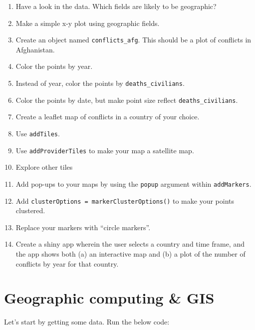 \documentclass[
]{book}
\begin{document}
\begin{enumerate}
\def\labelenumi{\arabic{enumi}.}
\setcounter{enumi}{2}
\item
  Have a look in the data. Which fields are likely to be geographic?
\item
  Make a simple x-y plot using geographic fields.
\item
  Create an object named \texttt{conflicts\_afg}. This should be a plot of conflicts in Afghanistan.
\item
  Color the points by year.
\item
  Instead of year, color the points by \texttt{deaths\_civilians}.
\item
  Color the points by date, but make point size reflect \texttt{deaths\_civilians}.
\item
  Create a leaflet map of conflicts in a country of your choice.
\item
  Use \texttt{addTiles}.
\item
  Use \texttt{addProviderTiles} to make your map a satellite map.
\item
  Explore other tiles
\item
  Add pop-ups to your maps by using the \texttt{popup} argument within \texttt{addMarkers}.
\item
  Add \texttt{clusterOptions\ =\ markerClusterOptions()} to make your points clustered.
\item
  Replace your markers with ``circle markers''.
\item
  Create a shiny app wherein the user selects a country and time frame, and the app shows both (a) an interactive map and (b) a plot of the number of conflicts by year for that country.
\end{enumerate}

\hypertarget{geographic-computing-gis}{%
\chapter{Geographic computing \& GIS}\label{geographic-computing-gis}}

Let's start by getting some data. Run the below code:
\end{document}
